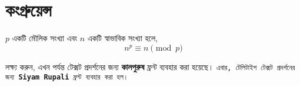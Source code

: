\documentclass{article}
\begin{document}
\section{কংগ্রুয়েন্স}
\begin{theorem}[ফার্মার লিটল থিওরেম]
$p$ একটি মৌলিক সংখ্যা এবং $n$ একটি স্বাভাবিক সংখ্যা হলে,
\[n^p\equiv n\pmod{p}\]
\end{theorem}
লক্ষ্য করুন, এখন পর্যন্ত টেক্সট প্রদর্শনের জন্য \textbf{কালপুরুষ} ফ্রন্ট ব্যবহার করা হয়েছে। \texttt{এবার, টেলিটাইপ টেক্সট প্রদর্শনের জন্য \textbf{Siyam Rupali} ফ্রন্ট ব্যবহার করা হল।}
\end{document}
